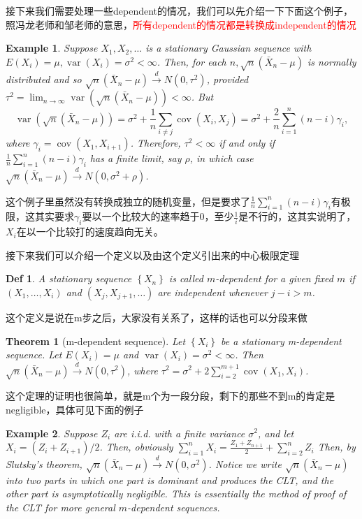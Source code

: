 \documentclass{article}
\newtheorem{theorem}{Theorem}[section]
\newtheorem{defination}{Def}[section]
\newtheorem{example}{Example}[section]
\begin{document}
接下来我们需要处理一些dependent的情况，我们可以先介绍一下下面这个例子，照冯龙老师和邹老师的意思，\textcolor{red}{所有dependent的情况都是转换成independent的情况}
\begin{example}
	Suppose $X_1, X_2, \ldots$ is a stationary Gaussian sequence with $E\left(X_i\right)=\mu, \operatorname{var}\left(X_i\right)=\sigma^2<\infty$. Then, for each $n, \sqrt{n}\left(\bar{X}_n-\mu\right)$ is normally distributed and so $\sqrt{n}\left(\bar{X}_n-\mu\right) \stackrel{d}{\rightarrow} N\left(0, \tau^2\right)$, provided $\tau^2=\lim _{n \rightarrow \infty} \operatorname{var}\left(\sqrt{n}\left(\bar{X}_n-\mu\right)\right)<\infty$. But
	$$
	\operatorname{var}\left(\sqrt{n}\left(\bar{X}_n-\mu\right)\right)=\sigma^2+\frac{1}{n} \sum_{i \neq j} \operatorname{cov}\left(X_i, X_j\right)=\sigma^2+\frac{2}{n} \sum_{i=1}^n(n-i) \gamma_i,
	$$
	where $\gamma_i=\operatorname{cov}\left(X_1, X_{i+1}\right)$. Therefore, $\tau^2<\infty$ if and only if $\frac{1}{n} \sum_{i=1}^n(n-i) \gamma_i$ has a finite limit, say $\rho$, in which case $\sqrt{n}\left(\bar{X}_n-\mu\right) \stackrel{d}{\rightarrow} N\left(0, \sigma^2+\rho\right)$.
\end{example}
这个例子里虽然没有转换成独立的随机变量，但是要求了$\frac{1}{n} \sum_{i=1}^n(n-i) \gamma_i$有极限，这其实要求$\gamma_i$要以一个比较大的速率趋于0，至少$\frac{1}{i}$是不行的，这其实说明了，$X_i$在以一个比较打的速度趋向无关。
\par 接下来我们可以介绍一个定义以及由这个定义引出来的中心极限定理
\begin{defination}
	A stationary sequence $\left\{X_n\right\}$ is called $m$-dependent for a given fixed $m$ if $\left(X_1, \ldots, X_i\right)$ and $\left(X_j, X_{j+1}, \ldots\right)$ are independent whenever $j-i>m$.
\end{defination}
这个定义是说在m步之后，大家没有关系了，这样的话也可以分段来做
\begin{theorem}[m-dependent sequence]
Let $\left\{X_i\right\}$ be a stationary m-dependent sequence. Let $E\left(X_i\right)=\mu$ and $\operatorname{var}\left(X_i\right)=\sigma^2<\infty$. Then $\sqrt{n}\left(\bar{X}_n-\mu\right) \stackrel{d}{\rightarrow} N\left(0, \tau^2\right)$, where $\tau^2=\sigma^2+2 \sum_{i=2}^{m+1} \operatorname{cov}\left(X_1, X_i\right)$.
\end{theorem}
这个定理的证明也很简单，就是m个为一段分段，剩下的那些不到m的肯定是negligible，具体可见下面的例子
\begin{example}
	Suppose $Z_i$ are i.i.d. with a finite variance $\sigma^2$, and let $X_i=\left(Z_i+Z_{i+1}\right) / 2$. Then, obviously $\sum_{i=1}^n X_i=\frac{Z_1+Z_{n+1}}{2}+\sum_{i=2}^n Z_i$ Then, by Slutsky's theorem, $\sqrt{n}\left(\bar{X}_n-\mu\right) \stackrel{d}{\rightarrow} N\left(0, \sigma^2\right)$. Notice we write $\sqrt{n}\left(\bar{X}_n-\mu\right)$ into two parts in which one part is dominant and produces the CLT, and the other part is asymptotically negligible. This is essentially the method of proof of the CLT for more general $m$-dependent sequences.
\end{example}
\end{document}
